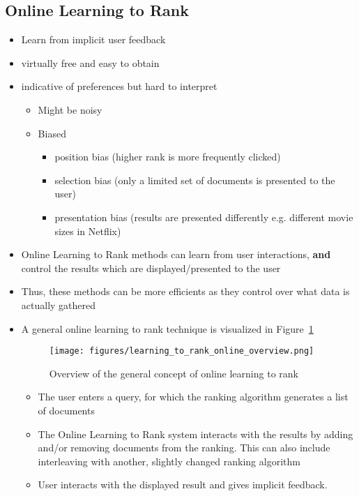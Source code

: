 \subsection{Online Learning to Rank}
\begin{itemize}
	\item Learn from implicit user feedback
	\item virtually free and easy to obtain
	\item indicative of preferences but hard to interpret
	\begin{itemize}
		\item Might be noisy
		\item Biased
		\begin{itemize}
			\item position bias (higher rank is more frequently clicked) 
			\item selection bias (only a limited set of documents is presented to the user)
			\item presentation bias (results are presented differently e.g. different movie sizes in Netflix)
		\end{itemize}
	\end{itemize}
	\item Online Learning to Rank methods can learn from user interactions, \textbf{and} control the results which are displayed/presented to the user
	\item Thus, these methods can be more efficients as they control over what data is actually gathered
	\item A general online learning to rank technique is visualized in Figure~\ref{img:learning_to_rank_online_overview}
	\begin{figure}[ht]
		\centering
		\texttt{[image: figures/learning\_to\_rank\_online\_overview.png]}
		\caption{Overview of the general concept of online learning to rank}
		\label{img:learning_to_rank_online_overview}
	\end{figure}
	\begin{itemize}
		\item The user enters a query, for which the ranking algorithm generates a list of documents
		\item The Online Learning to Rank system interacts with the results by adding and/or removing documents from the ranking. This can also include interleaving with another, slightly changed ranking algorithm
		\item User interacts with the displayed result and gives implicit feedback.

\end{itemize}
\end{itemize}
